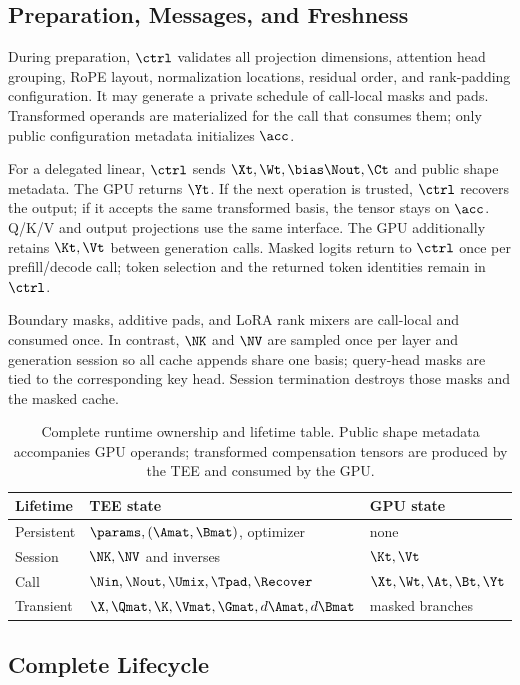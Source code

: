 \subsection{Preparation, Messages, and Freshness}

During preparation, $\ctrl$ validates all projection dimensions, attention
head grouping, RoPE layout, normalization locations, residual order, and
rank-padding configuration. It may generate a private schedule of call-local
masks and pads. Transformed operands are materialized for the call that
consumes them; only public configuration metadata initializes $\acc$.

For a delegated linear, $\ctrl$ sends $\Xt,\Wt,\bias\Nout,\Ct$ and public
shape metadata. The GPU returns $\Yt$. If the next operation is trusted,
$\ctrl$ recovers the output; if it accepts the same transformed basis, the
tensor stays on $\acc$. Q/K/V and output projections use the same interface.
The GPU additionally retains $\Kt,\Vt$ between generation calls. Masked logits
return to $\ctrl$ once per prefill/decode call; token selection and the returned
token identities remain in $\ctrl$.

Boundary masks, additive pads, and LoRA rank mixers are call-local and consumed
once. In contrast, $\NK$ and $\NV$ are sampled once per layer and generation
session so all cache appends share one basis; query-head masks are tied to the
corresponding key head. Session termination destroys those masks and the masked
cache.

\begin{table}[t]
\centering
\small
\begin{tabular}{lll}
\toprule
Lifetime & TEE state & GPU state \\
\midrule
Persistent & $\params,(\Amat,\Bmat)$, optimizer & none \\
Session & $\NK,\NV$ and inverses & $\Kt,\Vt$ \\
Call & $\Nin,\Nout,\Umix,\Tpad,\Recover$ & $\Xt,\Wt,\At,\Bt,\Yt$ \\
Transient & $\X,\Qmat,\K,\Vmat,\Gmat,d\Amat,d\Bmat$ & masked branches \\
\bottomrule
\end{tabular}
\caption{Complete runtime ownership and lifetime table. Public shape metadata
accompanies GPU operands; transformed compensation tensors are produced by the
TEE and consumed by the GPU.}
\label{tab:app-ownership}
\end{table}

\subsection{Complete Lifecycle}

